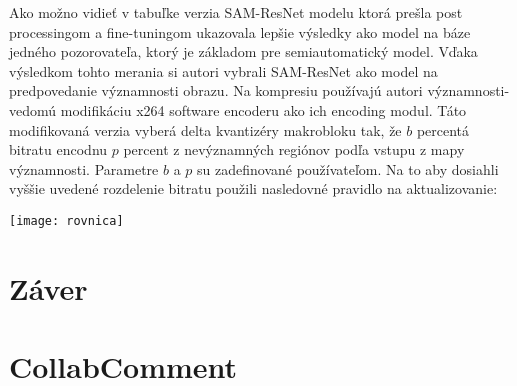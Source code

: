 \documentclass[10pt,twoside,slovak,a4paper]{article}
\begin{document}
Ako možno vidieť v tabuľke verzia SAM-ResNet modelu ktorá prešla post processingom a fine-tuningom ukazovala lepšie výsledky ako model na báze jedného pozorovateľa, ktorý je základom pre semiautomatický model. Vďaka výsledkom tohto merania si autori\cite{Czarnecki:Progress} vybrali SAM-ResNet ako model na predpovedanie významnosti obrazu.
Na kompresiu používajú autori\cite{Czarnecki:Progress} významnosti-vedomú modifikáciu x264 software encoderu ako ich encoding modul. Táto modifikovaná verzia vyberá delta kvantizéry makrobloku tak, že \(b\) percentá bitratu encodnu \(p\) percent z nevýznamných regiónov podľa vstupu z mapy významnosti. Parametre \(b\) a \(p\) su zadefinované používateľom. Na to aby dosiahli vyššie uvedené rozdelenie bitratu použili nasledovné pravidlo na aktualizovanie:
\begin{figure*}[tbh]
\centering
\texttt{[image: rovnica]}
\label{f:rovnica}
\end{figure*}

\section{Záver} \label{zaver} 
\section{CollabComment} \label{comment}

\end{document}
